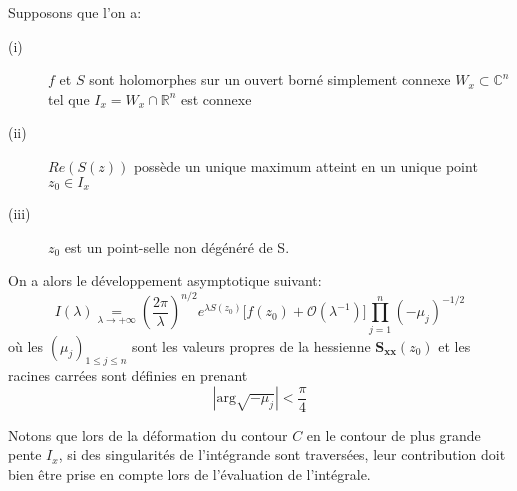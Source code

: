 \begin{prop}
Supposons que l'on a:
\begin{description}
  \item[(i)] $f$ et $S$ sont holomorphes sur un ouvert borné simplement connexe $W_x \subset \mathbb{C}^n$ tel que $I_x=W_x \cap \mathbb{R}^n$ est connexe
  \item[(ii)]$ Re\left( S(z) \right)$ possède un unique maximum atteint en un unique point $z_0 \in I_x$
  \item[(iii)] $z_0$ est un point-selle non dégénéré de S.
\end{description}
On a alors le développement asymptotique suivant:
\begin{equation}
I(\lambda) \underset{\lambda \to +\infty}{=} \left( \frac{2\pi}{\lambda} \right)^{n/2} e^{\lambda S(z_0)} \lbrack f(z_0)+ \mathcal{O}(\lambda^{-1}) \rbrack \prod_{j=1}^n (-\mu_j)^{-1/2}
\label{steepformula}
\end{equation}
où les $(\mu_j)_{1\leq j \leq n}$ sont les valeurs propres de la hessienne $\mathbf{S_{xx}}(z_0)$ et les racines carrées sont définies en prenant
$$|\mbox{arg} \sqrt{-\mu_j}| <\frac{\pi}{4} $$
\end{prop}
Notons que lors de la déformation du contour $C$ en le contour de plus grande pente $I_x$, si des singularités de l'intégrande sont traversées, leur contribution doit bien être prise en compte lors de l'évaluation de l'intégrale.